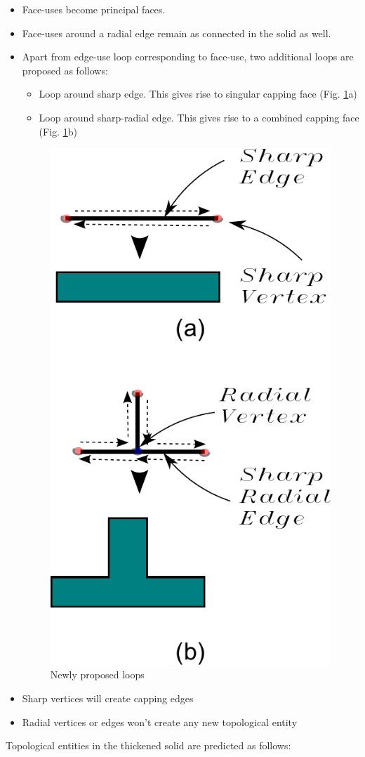 \begin{itemize}
[noitemsep,topsep=2pt,parsep=2pt,partopsep=2pt,leftmargin=*]

\item Face-uses become principal faces. 
\item Face-uses around a radial edge remain as connected in the solid as well. 
\item Apart from edge-use loop corresponding to face-use, two additional loops are proposed as follows:
	\begin{itemize}
	[noitemsep,topsep=2pt,parsep=2pt,partopsep=2pt,leftmargin=*]
	\item Loop around sharp edge. This gives rise to singular capping face  (Fig. \ref{fig_loops}a)
	\item Loop around sharp-radial edge. This gives rise to a combined capping face (Fig. \ref{fig_loops}b)
	\end{itemize}
	
 \begin{figure}[htbp]
\centering \includegraphics[width=0.34\linewidth]{../Common/images/NonManifoldLoopsToFaces.pdf}
\caption{Newly proposed loops}
\label{fig_loops}
 \end{figure}
 
\item Sharp vertices will create capping edges
\item Radial vertices or edges won't create any new topological entity
\end{itemize}
Topological entities in the thickened solid are predicted as follows:
